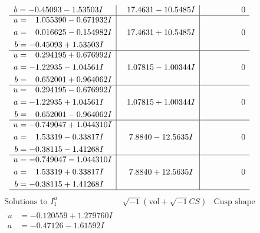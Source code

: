 \documentclass[1p]{elsarticle_modified}
\theoremstyle{definition}
\newcommand{\I}{\sqrt{-1}}
\begin{document}
$$\begin{array}{c|c|c}
\begin{aligned}
b &= -0.45093 - 1.53503 I\end{aligned}
 & \phantom{-}17.4631 - 10.5485 I & \phantom{-0.000000 } 0 \\ \hline\begin{aligned}
u &= \phantom{-}1.055390 - 0.671932 I \\
a &= \phantom{-}0.016625 - 0.154982 I \\
b &= -0.45093 + 1.53503 I\end{aligned}
 & \phantom{-}17.4631 + 10.5485 I & \phantom{-0.000000 } 0 \\ \hline\begin{aligned}
u &= \phantom{-}0.294195 + 0.676992 I \\
a &= -1.22935 - 1.04561 I \\
b &= \phantom{-}0.652001 + 0.964062 I\end{aligned}
 & \phantom{-}1.07815 - 1.00344 I & \phantom{-0.000000 } 0 \\ \hline\begin{aligned}
u &= \phantom{-}0.294195 - 0.676992 I \\
a &= -1.22935 + 1.04561 I \\
b &= \phantom{-}0.652001 - 0.964062 I\end{aligned}
 & \phantom{-}1.07815 + 1.00344 I & \phantom{-0.000000 } 0 \\ \hline\begin{aligned}
u &= -0.749047 + 1.044310 I \\
a &= \phantom{-}1.53319 - 0.33817 I \\
b &= -0.38115 - 1.41268 I\end{aligned}
 & \phantom{-}7.8840 - 12.5635 I & \phantom{-0.000000 } 0 \\ \hline\begin{aligned}
u &= -0.749047 - 1.044310 I \\
a &= \phantom{-}1.53319 + 0.33817 I \\
b &= -0.38115 + 1.41268 I\end{aligned}
 & \phantom{-}7.8840 + 12.5635 I & \phantom{-0.000000 } 0\\
 \hline 
 \end{array}$$\newpage$$\begin{array}{c|c|c}  
\text{Solutions to }I^u_{1}& \I (\text{vol} + \sqrt{-1}CS) & \text{Cusp shape}\\
 \hline 
\begin{aligned}
u &= -0.120559 + 1.279760 I \\
a &= -0.47126 - 1.61592 I \\

\end{aligned}
\end{array}$$
\end{document}
